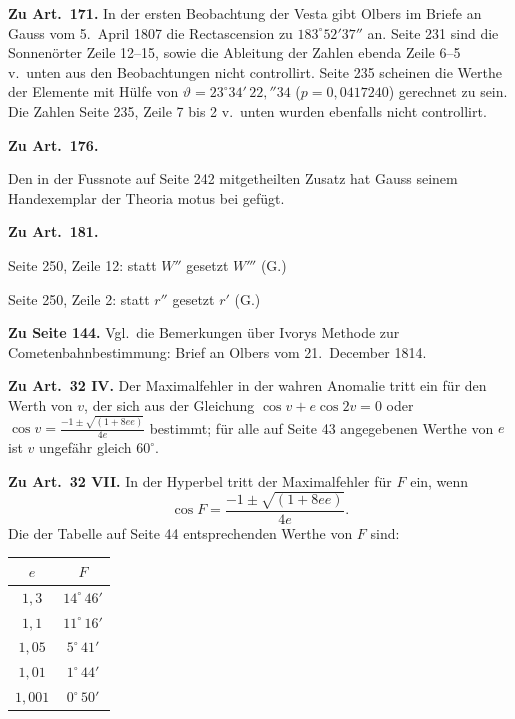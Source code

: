 \documentclass[11pt,a4paper]{article}
\begin{document}
\vspace{0.5em}
\noindent\textbf{Zu Art.~171.} In der ersten Beobachtung der Vesta gibt Olbers im Briefe an Gauss vom 5.\ April 1807 die Rectascension zu $183^\circ 52' 37''$ an. Seite 231 sind die Sonnenörter Zeile 12--15, sowie die Ableitung der Zahlen ebenda Zeile 6--5 v.\ unten aus den Beobachtungen nicht controllirt. Seite 235 scheinen die Werthe der Elemente mit Hülfe von $\vartheta = 23^\circ 34'\, 22{,}''34$ ($p = 0{,}0417240$) gerechnet zu sein. Die Zahlen Seite 235, Zeile 7 bis 2 v.\ unten wurden ebenfalls nicht controllirt.

\newpage
\setcounter{page}{264}

\noindent\textbf{Zu Art.~176.}

Den in der Fussnote auf Seite 242 mitgetheilten Zusatz hat Gauss seinem Handexemplar der Theoria motus bei gefügt.

\vspace{0.5em}
\noindent\textbf{Zu Art.~181.}

Seite 250, Zeile 12: statt $W''$ gesetzt $W'''$ (G.)

Seite 250, Zeile 2: statt $r''$ gesetzt $r'$ (G.)

\vspace{0.5em}
\noindent\textbf{Zu Seite 144.} Vgl.\ die Bemerkungen über Ivorys Methode zur Cometenbahnbestimmung: Brief an Olbers vom 21.\ December 1814.

\vspace{0.5em}
\noindent\textbf{Zu Art.~32 IV.} Der Maximalfehler in der wahren Anomalie tritt ein für den Werth von $v$, der sich aus der Gleichung $\cos v + e\cos 2v = 0$ oder $\cos v = \frac{-1 \pm \sqrt{(1 + 8ee)}}{4e}$ bestimmt; für alle auf Seite 43 angegebenen Werthe von $e$ ist $v$ ungefähr gleich $60^\circ$.

\vspace{0.5em}
\noindent\textbf{Zu Art.~32 VII.} In der Hyperbel tritt der Maximalfehler für $F$ ein, wenn
\[
\cos F = \frac{-1 \pm \sqrt{(1 + 8ee)}}{4e}.
\]
Die der Tabelle auf Seite 44 entsprechenden Werthe von $F$ sind:

\begin{center}
\begin{tabular}{c|c}
$e$ & $F$ \\
\midrule
$1{,}3$ & $14^\circ\, 46'$ \\
$1{,}1$ & $11^\circ\, 16'$ \\
$1{,}05$ & $5^\circ\, 41'$ \\
$1{,}01$ & $1^\circ\, 44'$ \\
$1{,}001$ & $0^\circ\, 50'$
\end{tabular}
\end{center}
\end{document}
